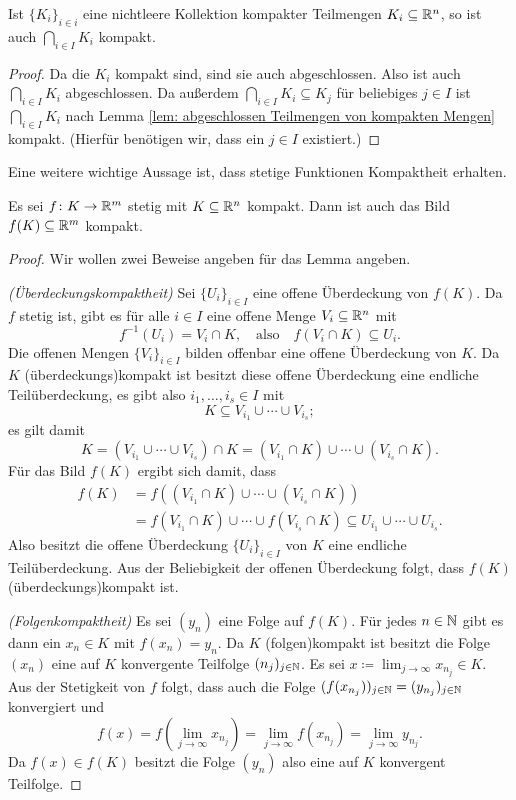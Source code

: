 \documentclass[a4paper,10pt]{article}
\begin{document}
\begin{kor}
 Ist $\{K_i\}_{i \in i}$ eine nichtleere Kollektion kompakter Teilmengen $K_i \subseteq \mathbb{R}^n$, so ist auch $\bigcap_{i \in I} K_i$ kompakt.
\end{kor}
\begin{proof}
 Da die $K_i$ kompakt sind, sind sie auch abgeschlossen. Also ist auch $\bigcap_{i \in I} K_i$ abgeschlossen. Da außerdem $\bigcap_{i \in I} K_i \subseteq K_j$ für beliebiges $j \in I$ ist $\bigcap_{i \in I} K_i$ nach Lemma \ref{lem: abgeschlossen Teilmengen von kompakten Mengen} kompakt. (Hierfür benötigen wir, dass ein $j \in I$ existiert.)
\end{proof}


Eine weitere wichtige Aussage ist, dass stetige Funktionen Kompaktheit erhalten.


\begin{lem}
 Es sei $f \colon K \to \mathbb{R}^m$ stetig mit $K \subseteq \mathbb{R}^n$ kompakt. Dann ist auch das Bild $f(K) \subseteq \mathbb{R}^m$ kompakt.
\end{lem}
\begin{proof}
 Wir wollen zwei Beweise angeben für das Lemma angeben.
 
 \emph{(Überdeckungskompaktheit)} Sei $\{U_i\}_{i \in I}$ eine offene Überdeckung von $f(K)$. Da $f$ stetig ist, gibt es für alle $i \in I$ eine offene Menge $V_i \subseteq \mathbb{R}^n$ mit
 \[
  f^{-1}(U_i) = V_i \cap K,
  \quad
  \text{also}
  \quad
  f(V_i \cap K) \subseteq U_i.
 \]
 Die offenen Mengen $\{V_i\}_{i \in I}$ bilden offenbar eine offene Überdeckung von $K$. Da $K$ (überdeckungs)kompakt ist besitzt diese offene Überdeckung eine endliche Teilüberdeckung, es gibt also $i_1, \dotsc, i_s \in I$ mit
 \[
  K \subseteq V_{i_1} \cup \dotsb \cup V_{i_s};
 \]
 es gilt damit
 \[
  K
  = (V_{i_1} \cup \dotsb \cup V_{i_s}) \cap K
  = (V_{i_1} \cap K) \cup \dotsb \cup (V_{i_s} \cap K).
 \]
 Für das Bild $f(K)$ ergibt sich damit, dass
 \begin{align*}
  f(K)
  &= f((V_{i_1} \cap K) \cup \dotsb \cup (V_{i_s} \cap K)) \\
  &= f(V_{i_1} \cap K) \cup \dotsb \cup f(V_{i_s} \cap K)
  \subseteq U_{i_1} \cup \dotsb \cup U_{i_s}.
 \end{align*}
 Also besitzt die offene Überdeckung $\{U_i\}_{i \in I}$ von $K$ eine endliche Teilüberdeckung. Aus der Beliebigkeit der offenen Überdeckung folgt, dass $f(K)$ (überdeckungs)kompakt ist.
 
 \emph{(Folgenkompaktheit)} Es sei $(y_n)$ eine Folge auf $f(K)$. Für jedes $n \in \mathbb{N}$ gibt es dann ein $x_n \in K$ mit $f(x_n) = y_n$. Da $K$ (folgen)kompakt ist besitzt die Folge $(x_n)$ eine auf $K$ konvergente Teilfolge $(n_j)_{j \in \mathbb{N}}$. Es sei $x \coloneqq \lim_{j \to \infty} x_{n_j} \in K$. Aus der Stetigkeit von $f$ folgt, dass auch die Folge $(f(x_{n_j}))_{j \in \mathbb{N}} = (y_{n_j})_{j \in \mathbb{N}}$ konvergiert und
 \[
  f(x)
  = f\left( \lim_{j \to \infty} x_{n_j} \right)
  = \lim_{j \to \infty} f(x_{n_j})
  = \lim_{j \to \infty} y_{n_j}.
 \]
 Da $f(x) \in f(K)$ besitzt die Folge $(y_n)$ also eine auf $K$ konvergent Teilfolge.
\end{proof}
\end{document}
